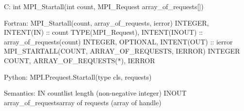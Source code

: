 C:
int MPI_Startall(int count, MPI_Request array_of_requests[])

Fortran:
MPI_Startall(count, array_of_requests, ierror)
INTEGER, INTENT(IN) :: count
TYPE(MPI_Request), INTENT(INOUT) :: array_of_requests(count)
INTEGER, OPTIONAL, INTENT(OUT) :: ierror
MPI_STARTALL(COUNT, ARRAY_OF_REQUESTS, IERROR)
INTEGER COUNT, ARRAY_OF_REQUESTS(*), IERROR

Python:
MPI.Prequest.Startall(type cls, requests)

Semantics:
IN countlist length (non-negative integer)
INOUT array_of_requestsarray of requests (array of handle)
